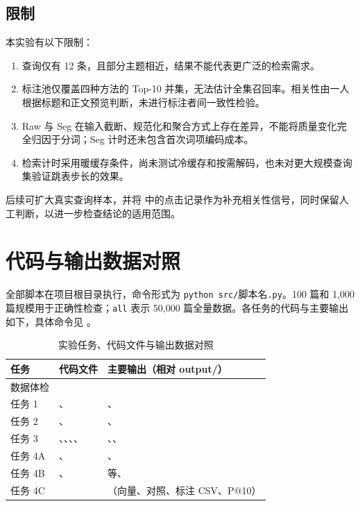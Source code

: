 \documentclass[UTF8,a4paper,11pt,fontset=fandol]{ctexart}
\begin{document}
\subsection{限制}
本实验有以下限制：
\begin{enumerate}
  \item 查询仅有 12 条，且部分主题相近，结果不能代表更广泛的检索需求。
  \item 标注池仅覆盖四种方法的 Top-10 并集，无法估计全集召回率。相关性由一人根据标题和正文预览判断，未进行标注者间一致性检验。
  \item Raw 与 Seg 在输入截断、规范化和聚合方式上存在差异，不能将质量变化完全归因于分词；Seg 计时还未包含首次词项编码成本。
  \item 检索计时采用暖缓存条件，尚未测试冷缓存和按需解码，也未对更大规模查询集验证跳表步长的效果。
\end{enumerate}
后续可扩大真实查询样本，并将  中的点击记录作为补充相关性信号，同时保留人工判断，以进一步检查结论的适用范围。

\vspace{2mm}


\appendix
\section{代码与输出数据对照}\label{app:files}
全部脚本在项目根目录执行，命令形式为 \texttt{python src/}\textnormal{脚本名}\texttt{.py}。100 篇和 1,000 篇规模用于正确性检查；\texttt{all} 表示 50,000 篇全量数据。各任务的代码与主要输出如下，具体命令见 。

\begin{table}[H]\centering\small
\caption{实验任务、代码文件与输出数据对照}
\begin{tabularx}{\linewidth}{@{}lY Y@{}}\toprule
任务 & 代码文件 & 主要输出（相对 output/） \\ \midrule
数据体检 &  &  \\
任务 1 & 、 & 、 \\
任务 2 & 、 & 、 \\
任务 3 & 、、、、 & 、、 \\
任务 4A & 、 & 、 \\
任务 4B & 、 &  等、 \\
任务 4C &  & （向量、对照、标注 CSV、P@10） \\
\bottomrule\end{tabularx}
\end{table}

\vspace{2mm}
\end{document}
